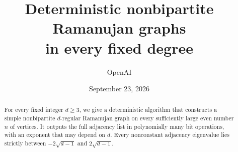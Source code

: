 \documentclass[11pt]{article}
\title{Deterministic nonbipartite Ramanujan graphs\\in every fixed degree}
\author{OpenAI}
\date{September 23, 2026}
\numberwithin{equation}{section}
\theoremstyle{definition}
\theoremstyle{remark}
\begin{document}
\maketitle
\begin{abstract}
For every fixed integer $d\ge3$, we give a deterministic algorithm
that constructs a simple nonbipartite $d$-regular Ramanujan graph on every
sufficiently large even number $n$ of vertices. It outputs the full adjacency
list in polynomially many bit operations, with an exponent that may depend on
$d$. Every nonconstant adjacency eigenvalue lies strictly between
$-2\sqrt{d-1}$ and $2\sqrt{d-1}$.
\end{abstract}
\clearpage
\begingroup
\small
\tableofcontents
\endgroup
\clearpage









\clearpage

\end{document}
